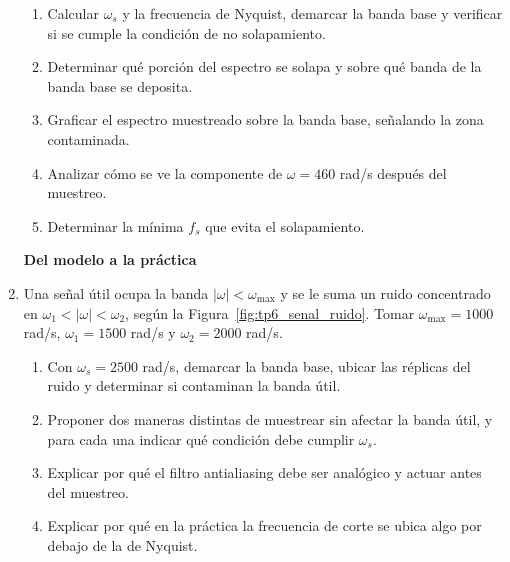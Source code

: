 \documentclass[10pt,a4paper]{article}
\begin{document}
\begin{multicols}{2}
\begin{enumerate}
		\begin{center}
			
			\label{fig:tp6_espectro_trapecio}
		\end{center}

		\begin{enumerate}
			\item Calcular $\omega_s$ y la frecuencia de Nyquist, demarcar la
			banda base y verificar si se cumple la condición de no
			solapamiento.
			\item Determinar qué porción del espectro se solapa y sobre qué
			banda de la banda base se deposita.
			\item Graficar el espectro muestreado sobre la banda base,
			señalando la zona contaminada.
			\item Analizar cómo se ve la componente de $\omega = 460$ rad/s
			después del muestreo.
			\item Determinar la mínima $f_s$ que evita el solapamiento.
		\end{enumerate}

		\textbf{Del modelo a la práctica}

		\item Una señal útil ocupa la banda $|\omega| < \omega_{\max}$ y se le
		suma un ruido concentrado en $\omega_1 < |\omega| < \omega_2$, según la
		Figura~\ref{fig:tp6_senal_ruido}. Tomar
		$\omega_{\max} = 1000$ rad/s, $\omega_1 = 1500$ rad/s y
		$\omega_2 = 2000$ rad/s.

		\begin{center}
			
			\label{fig:tp6_senal_ruido}
		\end{center}

		\begin{enumerate}
			\item Con $\omega_s = 2500$ rad/s, demarcar la banda base, ubicar
			las réplicas del ruido y determinar si contaminan la banda útil.
			\item Proponer dos maneras distintas de muestrear sin afectar la
			banda útil, y para cada una indicar qué condición debe cumplir
			$\omega_s$.
			\item Explicar por qué el filtro antialiasing debe ser analógico y
			actuar antes del muestreo.
			\item Explicar por qué en la práctica la frecuencia de corte se
			ubica algo por debajo de la de Nyquist.
		\end{enumerate}


\end{enumerate}
\end{multicols}
\end{document}
